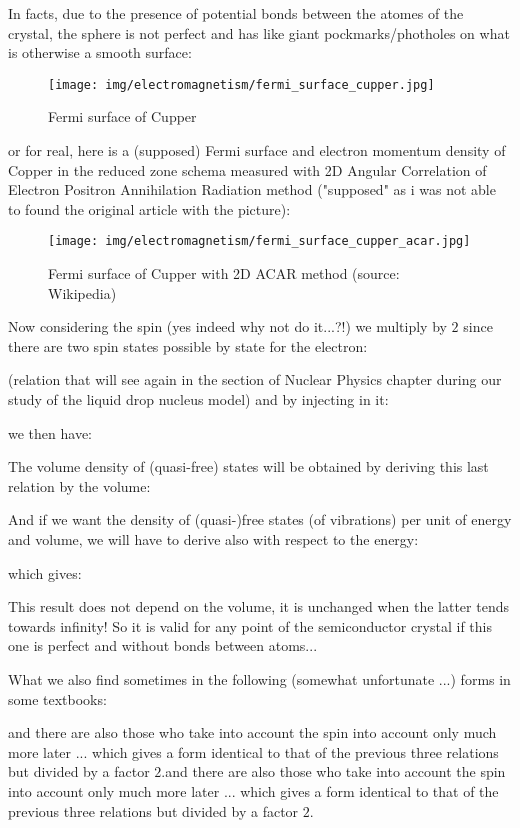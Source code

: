 	In facts, due to the presence of potential bonds between the atomes of the crystal, the sphere is not perfect and has like giant pockmarks/photholes on what is otherwise a smooth surface:
	\begin{figure}[H]
		\centering
		\texttt{[image: img/electromagnetism/fermi\_surface\_cupper.jpg]}
		\caption{Fermi surface of Cupper}
	\end{figure}
	or for real, here is a (supposed) Fermi surface and electron momentum density of Copper in the reduced zone schema measured with 2D Angular Correlation of Electron Positron Annihilation Radiation method ("supposed" as i was not able to found the original article with the picture):
	\begin{figure}[H]
		\centering
		\texttt{[image: img/electromagnetism/fermi\_surface\_cupper\_acar.jpg]}
		\caption{Fermi surface of Cupper with 2D ACAR method (source: Wikipedia)}
	\end{figure}
	Now considering the spin (yes indeed why not do it...?!) we multiply by $2$ since there are two spin states possible by state for the electron:
	
	(relation that will see again in the section of Nuclear Physics chapter during our study of the liquid drop nucleus model) and by injecting in it:
	
	we then have:
	
	The volume density of (quasi-free) states will be obtained by deriving this last relation by the volume:
	
	And if we want the density of (quasi-)free states (of vibrations) per unit of energy and volume, we will have to derive also with respect to the energy:
	
	which gives:
	
	This result does not depend on the volume, it is unchanged when the latter tends towards infinity! So it is valid for any point of the semiconductor crystal if this one is perfect and without bonds between atoms...
	
	What we also find sometimes in the following (somewhat unfortunate ...) forms in some textbooks:
	
	and there are also those who take into account the spin into account only much more later ... which gives a form identical to that of the previous three relations but divided by a factor $2$.and there are also those who take into account the spin into account only much more later ... which gives a form identical to that of the previous three relations but divided by a factor $2$.
	
